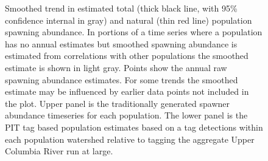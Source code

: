 \documentclass[
  letterpaper,
  oneside,
  open=any]{scrbook}
\begin{document}
\begin{figure}

\begin{minipage}[t]{\linewidth}

{\centering 


}

\end{minipage}%
\newline
\begin{minipage}[t]{\linewidth}

{\centering 


}

\end{minipage}%

\caption{\label{fig-UC-steelhead-smoothed-trends}Smoothed trend in
estimated total (thick black line, with 95\% confidence internal in
gray) and natural (thin red line) population spawning abundance. In
portions of a time series where a population has no annual estimates but
smoothed spawning abundance is estimated from correlations with other
populations the smoothed estimate is shown in light gray. Points show
the annual raw spawning abundance estimates. For some trends the
smoothed estimate may be influenced by earlier data points not included
in the plot. Upper panel is the traditionally generated spawner
abundance timeseries for each population. The lower panel is the PIT tag
based population estimates based on a tag detections within each
population watershed relative to tagging the aggregate Upper Columbia
River run at large.}

\end{figure}
\end{document}
